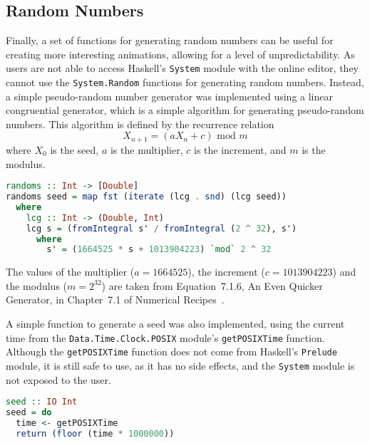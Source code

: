 \documentclass[../main.tex]{subfiles}
\begin{document}
        \subsection{Random Numbers}
            Finally, a set of functions for generating random numbers can be useful for
                creating more interesting animations, allowing for a level of unpredictability.
            As users are not able to access Haskell's \texttt{System} module with the
                online editor, they cannot use the \texttt{System.Random} functions for
                generating random numbers.
            Instead, a simple pseudo-random number generator was implemented using a linear
                congruential generator, which is a simple algorithm for generating
                pseudo-random numbers.
            This algorithm is defined by the recurrence relation $$X_{n+1} = (aX_n + c)
                    \text{ mod } m$$ where $X_0$ is the seed, $a$ is the multiplier, $c$ is the
                increment, and $m$ is the modulus.

            \begin{lstlisting}[language={Haskell}, label={lst:random}, caption={The random number 
                generator which uses a linear congruential generator to generate  an  infinite list
                of pseudo-random numbers, mapped to the range [0, 1].}]
randoms :: Int -> [Double]
randoms seed = map fst (iterate (lcg . snd) (lcg seed))
  where
    lcg :: Int -> (Double, Int)
    lcg s = (fromIntegral s' / fromIntegral (2 ^ 32), s')
      where
        s' = (1664525 * s + 1013904223) `mod` 2 ^ 32\end{lstlisting}

            The values of the multiplier ($a=1664525$), the increment ($c=1013904223$) and
                the modulus ($m=2^{32}$) are taken from Equation~7.1.6, An Even Quicker
                Generator, in Chapter~7.1 of Numerical Recipes~\citep{numericalRecipes}.

            A simple function to generate a seed was also implemented, using the current
                time from the \texttt{Data.Time.Clock.POSIX} module's \texttt{getPOSIXTime}
                function.
            Although the \texttt{getPOSIXTime} function does not come from Haskell's
                \texttt{Prelude} module, it is still safe to use, as it has no side effects,
                and the \texttt{System} module is not exposed to the user.

            \begin{lstlisting}[language={Haskell}, label={lst:seed}, caption={The \texttt{seed} 
                function.}]
seed :: IO Int
seed = do
  time <- getPOSIXTime
  return (floor (time * 1000000))\end{lstlisting}
\end{document}
